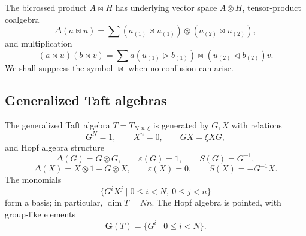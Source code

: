 \documentclass[twoside,11pt]{amsart}
\newcommand{\G}{\mathbf{G}}
\begin{document}
	The bicrossed product $A\bowtie H$ has underlying vector space $A\otimes H$,
	tensor-product coalgebra
	\[
	\Delta(a\bowtie u)
	=\sum(a_{(1)}\bowtie u_{(1)})\otimes
	(a_{(2)}\bowtie u_{(2)}),
	\]
	and multiplication
	\[
	(a\bowtie u)(b\bowtie v)
	=\sum a(u_{(1)}\triangleright b_{(1)})
	\bowtie (u_{(2)}\triangleleft b_{(2)})v.
	\]
	We shall suppress the symbol $\bowtie$ when no confusion can arise.
	
	
	
	
	\subsection{Generalized Taft algebras}
	
	The generalized Taft algebra $T=T_{N,n,\xi}$ is generated by $G,X$ with
	relations
	\[
	G^N=1,\qquad X^n=0,\qquad GX=\xi XG,
	\]
	and Hopf algebra structure
	\[
	\Delta(G)=G\otimes G,\qquad \varepsilon(G)=1,
	\qquad S(G)=G^{-1},
	\]
	\[
	\Delta(X)=X\otimes1+G\otimes X,\qquad
	\varepsilon(X)=0,\qquad S(X)=-G^{-1}X.
	\]
	The monomials
	\[
	\{G^iX^j\mid 0\le i<N,\ 0\le j<n\}
	\]
	form a basis; in particular, $\dim T=Nn$. The Hopf algebra is pointed, with
	group-like elements
	\[
	\G(T)=\{G^i\mid 0\le i<N\}.
	\]
	
\end{document}
